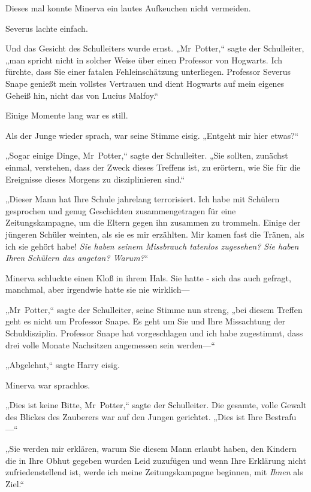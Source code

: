 {Dieses mal konnte Minerva ein lautes Aufkeuchen nicht vermeiden.

Severus lachte einfach.

Und das Gesicht des Schulleiters wurde ernst. „Mr~Potter,“ sagte der Schulleiter, „man spricht nicht in solcher Weise über einen Professor von Hogwarts. Ich fürchte, dass Sie einer fatalen Fehleinschätzung unterliegen. Professor Severus Snape genießt mein vollstes Vertrauen und dient Hogwarts auf mein eigenes Geheiß hin, nicht das von Lucius Malfoy.“

Einige Momente lang war es still.

Als der Junge wieder sprach, war seine Stimme eisig. „Entgeht mir hier etwas?“

„Sogar einige Dinge, Mr~Potter,“ sagte der Schulleiter. „Sie sollten, zunächst einmal, verstehen, dass der Zweck dieses Treffens ist, zu erörtern, wie Sie für die Ereignisse dieses Morgens zu disziplinieren sind.“

„Dieser Mann hat Ihre Schule jahrelang terrorisiert. Ich habe mit Schülern gesprochen und genug Geschichten zusammengetragen für eine Zeitungskampagne, um die Eltern gegen ihn zusammen zu trommeln. Einige der jüngeren Schüler weinten, als sie es mir erzählten. Mir kamen fast die Tränen, als ich sie gehört habe! \emph{Sie haben seinem Missbrauch tatenlos zugesehen? Sie haben Ihren Schülern das angetan? Warum?}“

Minerva schluckte einen Kloß in ihrem Hals. Sie hatte - sich das auch gefragt, manchmal, aber irgendwie hatte sie nie wirklich—

„Mr~Potter,“ sagte der Schulleiter, seine Stimme nun streng, „bei diesem Treffen geht es nicht um Professor Snape. Es geht um Sie und Ihre Missachtung der Schuldisziplin. Professor Snape hat vorgeschlagen und ich habe zugestimmt, dass drei volle Monate Nachsitzen angemessen sein werden—“

„Abgelehnt,“ sagte Harry eisig.

Minerva war sprachlos.

„Dies ist keine Bitte, Mr~Potter,“ sagte der Schulleiter. Die gesamte, volle Gewalt des Blickes des Zauberers war auf den Jungen gerichtet. „Dies ist Ihre Bestrafu—“

„Sie werden mir erklären, warum Sie diesem Mann erlaubt haben, den Kindern die in Ihre Obhut gegeben wurden Leid zuzufügen und wenn Ihre Erklärung nicht zufriedenstellend ist, werde ich meine Zeitungskampagne beginnen, mit \emph{Ihnen} als Ziel.“

}

